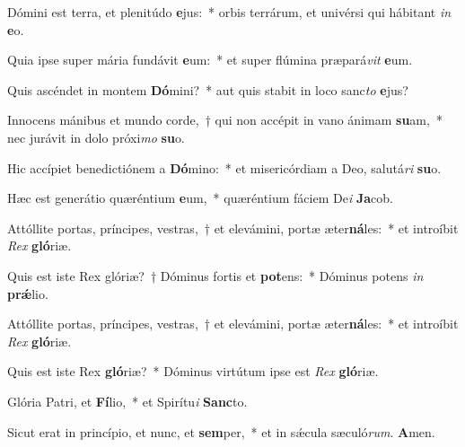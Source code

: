 \item Dómini est terra, et plenitúdo \textbf{e}jus:~* orbis terrárum, et univérsi qui hábitant \textit{in} \textbf{e}o.
\item Quia ipse super mária fundávit \textbf{e}um:~* et super flúmina præpará\textit{vit} \textbf{e}um.
\item Quis ascéndet in montem \textbf{Dó}mini?~* aut quis stabit in loco sanc\textit{to} \textbf{e}jus?
\item Innocens mánibus et mundo corde,~† qui non accépit in vano ánimam \textbf{su}am,~* nec jurávit in dolo próxi\textit{mo} \textbf{su}o.
\item Hic accípiet benedictiónem a \textbf{Dó}mino:~* et misericórdiam a Deo, salutá\textit{ri} \textbf{su}o.
\item Hæc est generátio quæréntium \textbf{e}um,~* quæréntium fáciem De\textit{i} \textbf{Ja}cob.
\item Attóllite portas, príncipes, vestras,~† et elevámini, portæ æter\textbf{ná}les:~* et introíbit \textit{Rex} \textbf{gló}riæ.
\item Quis est iste Rex glóriæ?~† Dóminus fortis et \textbf{pot}ens:~* Dóminus potens \textit{in} \textbf{prǽ}lio.
\item Attóllite portas, príncipes, vestras,~† et elevámini, portæ æter\textbf{ná}les:~* et introíbit \textit{Rex} \textbf{gló}riæ.
\item Quis est iste Rex \textbf{gló}riæ?~* Dóminus virtútum ipse est \textit{Rex} \textbf{gló}riæ.
\item Glória Patri, et \textbf{Fí}lio,~* et Spirítu\textit{i} \textbf{Sanc}to.
\item Sicut erat in princípio, et nunc, et \textbf{sem}per,~* et in sǽcula sæculó\textit{rum}. \textbf{A}men.
